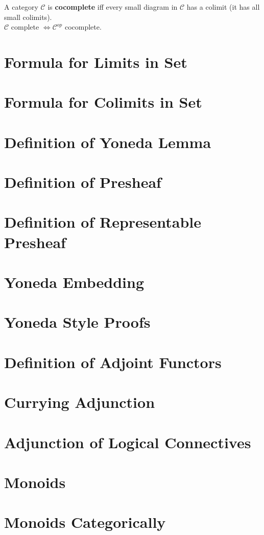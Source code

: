 \documentclass[a4paper, twoside, english, 11pt]{book}
\newcommand{\C}{\mathcal C}
\begin{document}
A category $\C$ is \textbf{cocomplete} iff every small diagram in $\C$ has a colimit (it has all small colimits). \\

$\C$ complete $\iff \C^{op}$ cocomplete.



\section{Formula for Limits in Set}
\section{Formula for Colimits in Set}
\section{Definition of Yoneda Lemma}
\section{Definition of Presheaf}
\section{Definition of Representable Presheaf}
\section{Yoneda Embedding}
\section{Yoneda Style Proofs}
\section{Definition of Adjoint Functors}
\section{Currying Adjunction}
\section{Adjunction of Logical Connectives}
\section{Monoids}
\section{Monoids Categorically}
\end{document}
